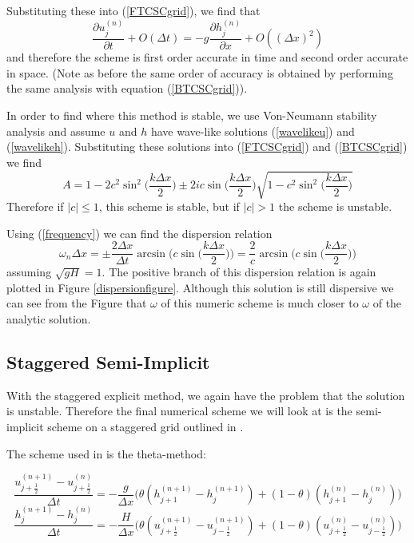 \documentclass[a4paper,12pt, notitlepage]{article}
\begin{document}
Substituting these into (\ref{FTCSCgrid}), we find that 
\begin{equation}
\frac{\partial u_{j}^{(n)}}{\partial t} + O(\Delta t) =  -g \frac{\partial h_{j}^{(n)}}{\partial x} + O((\Delta x)^{2})
\end{equation} 
and therefore the scheme is first order accurate in time and second order accurate in space. (Note as before the same order of accuracy is obtained by performing the same analysis with equation (\ref{BTCSCgrid})).

In order to find where this method is stable, we use Von-Neumann stability analysis and assume $u$ and $h$ have wave-like solutions (\ref{wavelikeu}) and (\ref{wavelikeh}). Substituting these solutions into (\ref{FTCSCgrid}) and (\ref{BTCSCgrid}) we find
\begin{equation}
A = 1 - 2c^{2}\sin^{2}\bigg(\frac{k\Delta x}{2}\bigg) \pm 2ic\sin\bigg(\frac{k\Delta x}{2}\bigg) \sqrt{1 - c^{2}\sin^{2}(\frac{k\Delta x}{2}\bigg)}
\end{equation}
Therefore if $\lvert c \rvert \leq 1$, this scheme is stable, but if $\lvert c \rvert > 1$ the scheme is unstable.

Using (\ref{frequency}) we can find the dispersion relation
\begin{equation}
	\omega_{n} \Delta x = \pm\frac{2\Delta x}{\Delta t} \arcsin\bigg(c\sin\bigg(\frac{k\Delta x}{2}\bigg)\bigg) = \frac{2}{c} \arcsin\bigg(c\sin\bigg(\frac{k\Delta x}{2}\bigg)\bigg) 
\end{equation}
assuming $\sqrt{gH} = 1$. The positive branch of this dispersion relation is again plotted in Figure \ref{dispersionfigure}. Although this solution is still dispersive we can see from the Figure that $\omega$ of this numeric scheme is much closer to $\omega$ of the analytic solution.

\subsection{Staggered Semi-Implicit}
With the staggered explicit method, we again have the problem that the solution is unstable. Therefore the final numerical scheme we will look at is the semi-implicit scheme on a staggered grid outlined in \cite{semi-implicit}.

The scheme used in \cite{semi-implicit} is the theta-method:

\begin{equation}
\frac{u_{j + \frac{1}{2}}^{(n + 1)} - u_{j + \frac{1}{2}}^{(n)}}{\Delta t} = -\frac{g}{\Delta x} \bigg(\theta (h_{j + 1}^{(n+ 1)} - h_{j}^{(n+ 1)}) + (1 - \theta) (h_{j + 1}^{(n)} - h_{j}^{(n)})\bigg)
\end{equation}
\begin{equation}
\frac{h_{j}^{(n + 1)} - h_{j}^{(n)}}{\Delta t} = -\frac{H}{\Delta x} \bigg(\theta (u_{j + \frac{1}{2}}^{(n+ 1)} - u_{j - \frac{1}{2}}^{(n+ 1)}) + (1 - \theta) (u_{j + \frac{1}{2}}^{(n)} - u_{j - \frac{1}{2}}^{(n)})\bigg)
\end{equation}
\end{document}
